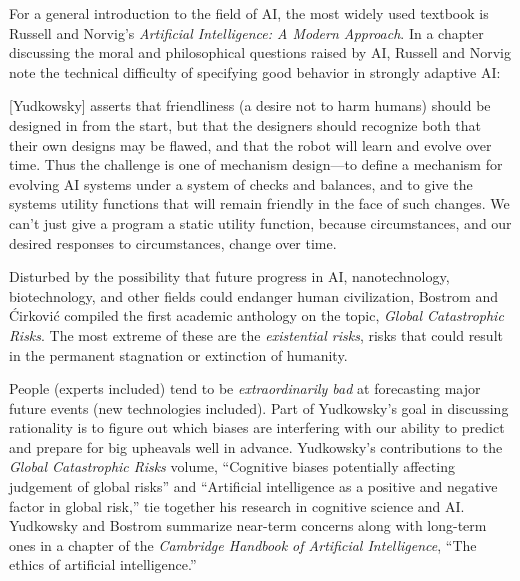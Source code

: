 {
 For a general introduction to the field of AI, the most widely
used textbook is Russell and Norvig's
\textit{Artificial Intelligence: A Modern Approach}.
In a chapter discussing the moral and philosophical questions raised by
AI, Russell and Norvig note the technical difficulty of specifying good
behavior in strongly adaptive AI:}

{
 [Yudkowsky] asserts that friendliness (a desire not to harm
humans) should be designed in from the start, but that the designers
should recognize both that their own designs may be flawed, and that
the robot will learn and evolve over time. Thus the challenge is one of
mechanism design---to define a mechanism for evolving AI systems under
a system of checks and balances, and to give the systems utility
functions that will remain friendly in the face of such changes. We
can't just give a program a static utility function,
because circumstances, and our desired responses to circumstances,
change over time.}

{
 Disturbed by the possibility that future progress in AI,
nanotechnology, biotechnology, and other fields could endanger human
civilization, Bostrom and \'Cirkovi\'c compiled the first academic
anthology on the topic, \textit{Global Catastrophic
Risks}. The most extreme of these are the
\textit{existential risks}, risks that could result in the permanent
stagnation or extinction of humanity.}

{
 People (experts included) tend to be \textit{extraordinarily bad}
at forecasting major future events (new technologies included). Part of
Yudkowsky's goal in discussing rationality is to figure
out which biases are interfering with our ability to predict and
prepare for big upheavals well in advance. Yudkowsky's
contributions to the \textit{Global Catastrophic Risks} volume,
``Cognitive biases potentially affecting judgement of
global risks'' and ``Artificial
intelligence as a positive and negative factor in global
risk,'' tie together his research in cognitive
science and AI. Yudkowsky and Bostrom summarize near-term concerns
along with long-term ones in a chapter of the \textit{Cambridge
Handbook of Artificial Intelligence}, ``The ethics of
artificial intelligence.''}

